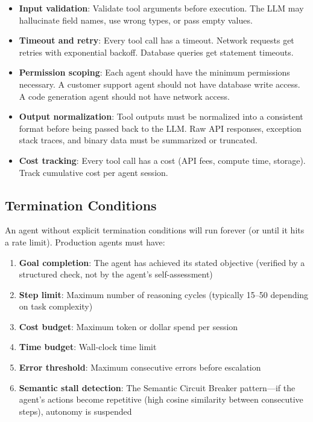\begin{itemize}[leftmargin=*]
    \item \textbf{Input validation}: Validate tool arguments before execution. The LLM may hallucinate field names, use wrong types, or pass empty values.
    \item \textbf{Timeout and retry}: Every tool call has a timeout. Network requests get retries with exponential backoff. Database queries get statement timeouts.
    \item \textbf{Permission scoping}: Each agent should have the minimum permissions necessary. A customer support agent should not have database write access. A code generation agent should not have network access.
    \item \textbf{Output normalization}: Tool outputs must be normalized into a consistent format before being passed back to the LLM. Raw API responses, exception stack traces, and binary data must be summarized or truncated.
    \item \textbf{Cost tracking}: Every tool call has a cost (API fees, compute time, storage). Track cumulative cost per agent session.
\end{itemize}

\subsection{Termination Conditions}

An agent without explicit termination conditions will run forever (or until it hits a rate limit). Production agents must have:

\begin{enumerate}[leftmargin=*]
    \item \textbf{Goal completion}: The agent has achieved its stated objective (verified by a structured check, not by the agent's self-assessment)
    \item \textbf{Step limit}: Maximum number of reasoning cycles (typically 15--50 depending on task complexity)
    \item \textbf{Cost budget}: Maximum token or dollar spend per session
    \item \textbf{Time budget}: Wall-clock time limit
    \item \textbf{Error threshold}: Maximum consecutive errors before escalation
    \item \textbf{Semantic stall detection}: The Semantic Circuit Breaker pattern---if the agent's actions become repetitive (high cosine similarity between consecutive steps), autonomy is suspended
\end{enumerate}

